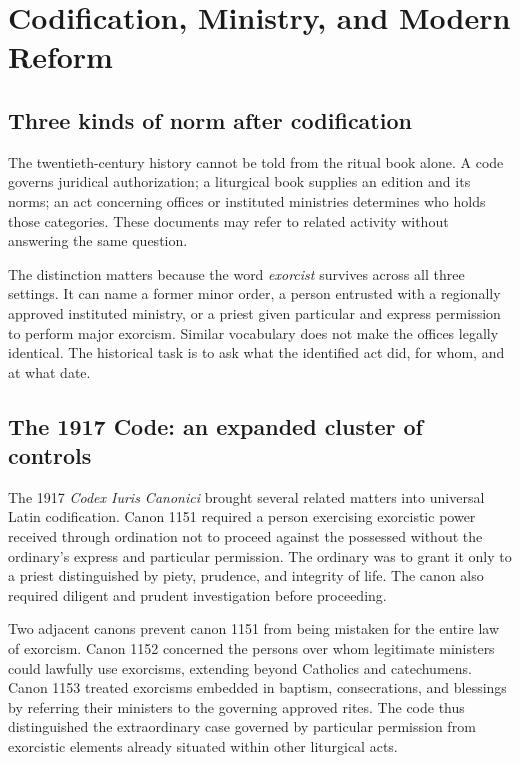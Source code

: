 \section{Codification, Ministry, and Modern Reform}

\subsection{Three kinds of norm after codification}

The twentieth-century history cannot be told from the ritual book alone. A
code governs juridical authorization; a liturgical book supplies an edition
and its norms; an act concerning offices or instituted ministries determines
who holds those categories. These documents may refer to related activity
without answering the same question.

The distinction matters because the word \emph{exorcist} survives across all
three settings. It can name a former minor order, a person entrusted with a
regionally approved instituted ministry, or a priest given particular and
express permission to perform major exorcism. Similar vocabulary does not
make the offices legally identical. The historical task is to ask what the
identified act did, for whom, and at what date.

\subsection{The 1917 Code: an expanded cluster of controls}

The 1917 \emph{Codex Iuris Canonici} brought several related matters into
universal Latin codification. Canon 1151 required a person exercising
exorcistic power received through ordination not to proceed against the
possessed without the ordinary's express and particular permission. The
ordinary was to grant it only to a priest distinguished by piety, prudence,
and integrity of life. The canon also required diligent and prudent
investigation before proceeding.

Two adjacent canons prevent canon 1151 from being mistaken for the entire law
of exorcism. Canon 1152 concerned the persons over whom legitimate ministers
could lawfully use exorcisms, extending beyond Catholics and catechumens.
Canon 1153 treated exorcisms embedded in baptism, consecrations, and blessings
by referring their ministers to the governing approved rites. The code thus
distinguished the extraordinary case governed by particular permission from
exorcistic elements already situated within other liturgical acts.

